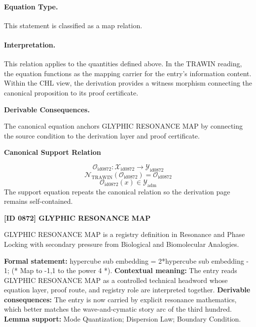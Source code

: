 \paragraph{Equation Type.}
This statement is classified as a map relation.

\paragraph{Interpretation.}
This relation applies to the quantities defined above. In the TRAWIN reading, the equation functions as the mapping carrier for the entry’s information content. Within the CHL view, the derivation provides a witness morphism connecting the canonical proposition to its proof certificate.

\par\vspace{0.35em}
\noindent\textbf{Derivable Consequences.}\quad
\begingroup
\footnotesize
\raggedright
The canonical equation anchors GLYPHIC RESONANCE MAP by connecting the source condition to the derivation layer and proof certificate.
\par\endgroup

\noindent\textbf{Canonical Support Relation}\par
\[
\mathcal{O}_{\mathrm{id0872}}:\mathcal{X}_{\mathrm{id0872}}\longrightarrow\mathcal{Y}_{\mathrm{id0872}}
\]
\[
\mathcal{N}_{\mathrm{TRAWIN}}(\mathcal{O}_{\mathrm{id0872}})=\mathcal{O}_{\mathrm{id0872}}
\]
\[
\mathcal{O}_{\mathrm{id0872}}(x)\in\mathcal{Y}_{\mathrm{adm}}
\]
\noindent The support equation repeats the canonical relation so the derivation page remains self-contained.\par

\clearpage
\noindent\textbf{[ID 0872] GLYPHIC RESONANCE MAP}\par
\vspace{0.35em}
\begingroup\small
{}
GLYPHIC RESONANCE MAP is a registry definition in Resonance and Phase Locking with secondary pressure from Biological and Biomolecular Analogies.

\begingroup\footnotesize\setlength{\emergencystretch}{3em}\sloppy
\textbf{Formal statement:} hypercube sub embedding = 2*hypercube sub embedding - 1; (* Map to -1,1 to the power 4 *). \textbf{Contextual meaning:} The entry reads GLYPHIC RESONANCE MAP as a controlled technical headword whose equation layer, proof route, and registry role are interpreted together. \textbf{Derivable consequences:} The entry is now carried by explicit resonance mathematics, which better matches the wave-and-cymatic story arc of the third hundred. \textbf{Lemma support:} Mode Quantization; Dispersion Law; Boundary Condition.\par
\endgroup

